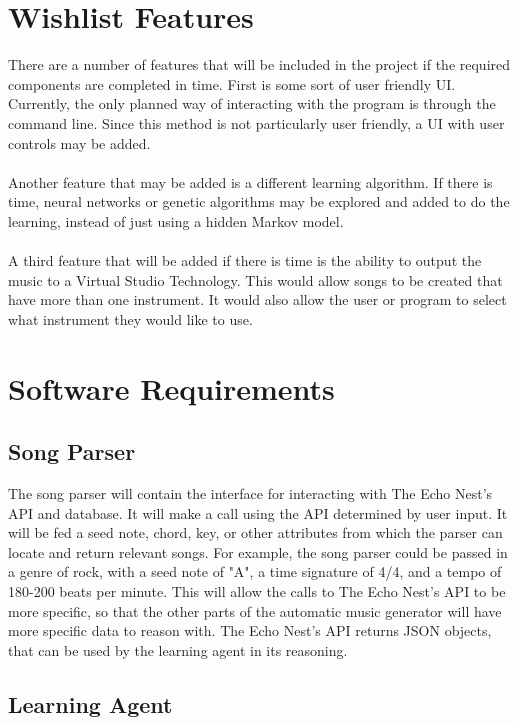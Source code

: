 \documentclass{article}
\begin{document}
\section{Wishlist Features}
There are a number of features that will be included in the project if the required components are completed in time. First is some sort of user friendly UI. Currently, the only planned way of interacting with the program is through the command line. Since this method is not particularly user friendly, a UI with user controls may be added.\\
\\
Another feature that may be added is a different learning algorithm. If there is time, neural networks or genetic algorithms may be explored and added to do the learning, instead of just using a hidden Markov model.\\
\\
A third feature that will be added if there is time is the ability to output the music to a Virtual Studio Technology. This would allow songs to be created that have more than one instrument. It would also allow the user or program to select what instrument they would like to use.

\section{Software Requirements}
\subsection{Song Parser}
The song parser will contain the interface for interacting with The Echo Nest's API and database.  It will make a call using the API determined by user input.  It will be fed a seed note, chord, key, or other attributes from which the parser can locate and return relevant songs.  For example, the song parser could be passed in a genre of rock, with a seed note of "A", a time signature of 4/4, and a tempo of 180-200 beats per minute.  This will allow the calls to The Echo Nest's API to be more specific, so that the other parts of the automatic music generator will have more specific data to reason with.  The Echo Nest's API returns JSON objects, that can be used by the learning agent in its reasoning.

\subsection{Learning Agent}
\end{document}
